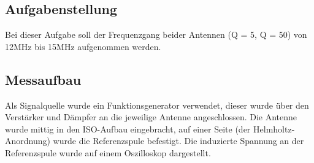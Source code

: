 \documentclass[12pt,a4paper,ngerman]{article}
\begin{document}
\subsection{Aufgabenstellung}
Bei dieser Aufgabe soll der Frequenzgang beider Antennen (Q = 5, Q = 50) von 12MHz bis 15MHz aufgenommen werden.\\

\subsection{Messaufbau}
Als Signalquelle wurde ein Funktionsgenerator verwendet, dieser wurde über den Verstärker und Dämpfer an die jeweilige Antenne angeschlossen.
Die Antenne wurde mittig in den ISO-Aufbau eingebracht, auf einer Seite (der Helmholtz-Anordnung) wurde die Referenzspule befestigt. 
Die induzierte Spannung an der Referenzspule wurde auf einem Oszilloskop dargestellt. 
\end{document}
